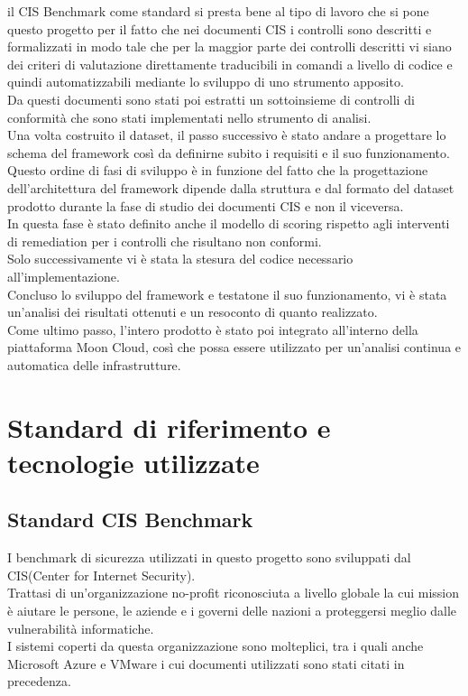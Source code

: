 \documentclass[a4paper,11pt]{report}
\begin{document}
il CIS Benchmark come standard si presta bene al tipo di lavoro che si pone questo progetto per il fatto che nei documenti CIS i controlli sono descritti e formalizzati in modo tale che per la maggior parte dei controlli descritti vi siano dei criteri di valutazione direttamente traducibili in comandi a livello di codice e quindi automatizzabili mediante lo sviluppo di uno strumento apposito. \\

Da questi documenti sono stati poi estratti un sottoinsieme di controlli di conformità che sono stati implementati nello strumento di analisi. \\
Una volta costruito il dataset, il passo successivo è stato andare a progettare lo schema del framework così da definirne subito i requisiti e il suo funzionamento. \\
Questo ordine di fasi di sviluppo è in funzione del fatto che la progettazione dell'architettura del framework dipende dalla struttura e dal formato del dataset prodotto durante la fase di studio dei documenti CIS e non il viceversa. \\
In questa fase è stato definito anche il modello di scoring rispetto agli interventi di remediation per i controlli che risultano non conformi. \\
Solo successivamente vi è stata la stesura del codice necessario all'implementazione. \\
Concluso lo sviluppo del framework e testatone il suo funzionamento, vi è stata un'analisi dei risultati ottenuti e un resoconto di quanto realizzato.\\
Come ultimo passo, l'intero prodotto è stato poi integrato all'interno della piattaforma Moon Cloud\cite{Anisetti2018}, così che possa essere utilizzato per un'analisi continua e automatica delle infrastrutture.



\chapter{Standard di riferimento e tecnologie utilizzate}

\section{Standard CIS Benchmark}

I benchmark di sicurezza utilizzati in questo progetto sono sviluppati dal CIS(Center for Internet Security).\\
Trattasi di un'organizzazione no-profit riconosciuta a livello globale la cui mission è aiutare le persone, le aziende e i governi delle nazioni a proteggersi meglio dalle vulnerabilità informatiche. \cite{CIS} \\
I sistemi coperti da questa organizzazione sono molteplici, tra i quali anche Microsoft Azure e VMware i cui documenti utilizzati sono stati citati in precedenza.\\ \\ \\
\end{document}
